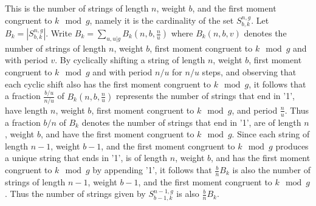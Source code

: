\documentclass[12pt]{article} \pagestyle{plain} \topmargin
\begin{document}
This is  the number of strings of length $n$, weight $b$, and the
first moment congruent to $k \mod g$, namely it is the cardinality
of the set $S_{b,k}^{n,g}$. Let $B_k=|S_{b,k}^{n,g}|$. Write $B_k=
\sum_{u,u|g} B_k(n,b,\frac{n}{u})$ where $B_k(n,b,v)$ denotes the
number of strings of length $n$, weight $b$, first moment congruent
to $k \mod g$ and with period $v$. By cyclically shifting a string
of length $n$, weight $b$, first moment congruent to $k \mod g$ and
with period $n/u$ for $n/u$ steps, and observing that each cyclic
shift also has the first moment congruent to $k \mod g$, it follows
that a fraction $\frac{b/u}{n/u}$ of $B_k(n,b,\frac{n}{u})$
represents the number of strings that end in '1', have length $n$,
weight $b$, first moment congruent to $k \mod g$, and period
$\frac{n}{u}$. Thus a fraction $b/n$ of $B_k$ denotes the number of
strings that end in '1', are of length $n$, weight $b$, and have the
first moment congruent to $k \mod g$. Since each string of length
$n-1$, weight $b-1$, and the first moment congruent to $k \mod g$
produces a unique string that ends in '1', is of length $n$, weight
$b$, and has the first moment congruent to $k \mod g$ by appending
'1', it follows that $\frac{b}{n}B_k$ is also the number of strings
of length $n-1$, weight $b-1$, and the first moment congruent to $k
\mod g$. Thus the number of strings given by $S_{b-1,k}^{n-1,g}$ is
also $\frac{b}{n}B_k$.
\end{document}
